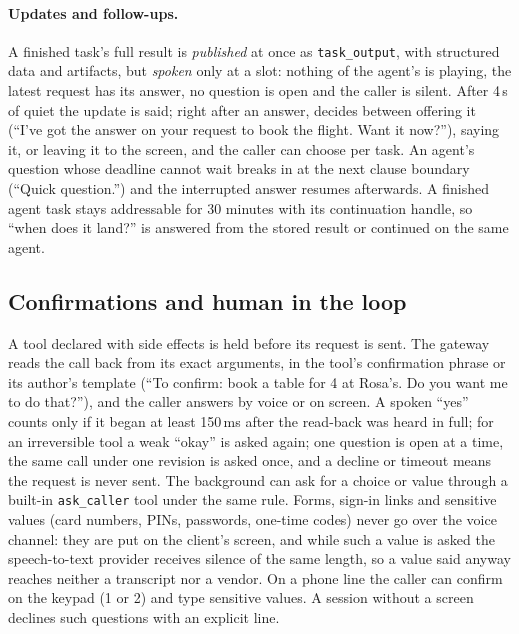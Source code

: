 \paragraph{Updates and follow-ups.}
A finished task's full result is \emph{published} at once as \texttt{task\_output}, with structured data and artifacts, but
\emph{spoken} only at a slot: nothing of the agent's is playing, the latest request has its answer, no question is open and the
caller is silent. After 4\,s of quiet the update is said; right after an answer,  decides between offering
it (``I've got the answer on your request to book the flight. Want it now?''), saying it, or leaving it to the screen, and the
caller can choose per task. An agent's question whose deadline cannot wait breaks in at the next clause boundary (``Quick
question.'') and the interrupted answer resumes afterwards. A finished agent task stays addressable for 30 minutes with its
continuation handle, so ``when does it land?'' is answered from the stored result or continued on the same agent.

\subsection{Confirmations and human in the loop}\label{sec:sys-hitl}

A tool declared with side effects is held before its request is sent. The gateway reads the call back from its exact arguments,
in the tool's confirmation phrase or its author's template (``To confirm: book a table for 4 at Rosa's. Do you want me to do
that?''), and the caller answers by voice or on screen. A spoken ``yes'' counts only if it began at least 150\,ms after the
read-back was heard in full; for an irreversible tool a weak ``okay'' is asked again; one question is open at a time, the same
call under one revision is asked once, and a decline or timeout means the request is never sent. The background can ask for a
choice or value through a built-in \texttt{ask\_caller} tool under the same rule. Forms, sign-in links and sensitive values (card
numbers, PINs, passwords, one-time codes) never go over the voice channel: they are put on the client's screen, and while such a
value is asked the speech-to-text provider receives silence of the same length, so a value said anyway reaches neither a
transcript nor a vendor. On a phone line the caller can confirm on the keypad (1 or 2) and type sensitive values. A session
without a screen declines such questions with an explicit line.

